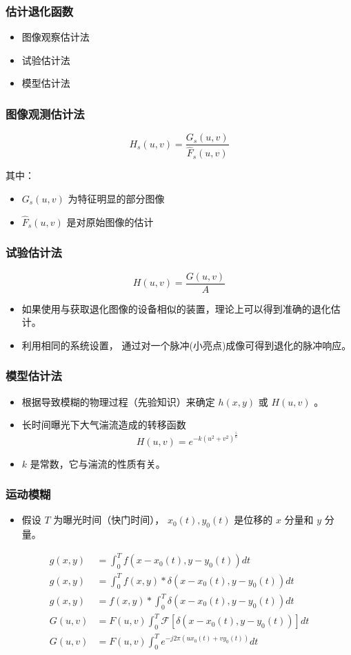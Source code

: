 \documentclass{beamer}
\begin{document}
\begin{frame}
\frametitle{估计退化函数}
\label{sec-9-5}

\begin{itemize}
\item 图像观察估计法
\item 试验估计法
\item 模型估计法
\end{itemize}
\end{frame}
\begin{frame}
\frametitle{图像观测估计法}
\label{sec-9-6}


\[ H_s(u,v) = \frac{G_s(u,v)}{\hat F_s(u,v)} \]

其中：
\begin{itemize}
\item $G_s(u,v)$ 为特征明显的部分图像
\item $\hat F_s(u,v)$ 是对原始图像的估计
\end{itemize}
\end{frame}
\begin{frame}
\frametitle{试验估计法}
\label{sec-9-7}


\[ H(u,v)=\frac{G(u,v)}{A} \]

\begin{itemize}
\item 如果使用与获取退化图像的设备相似的装置，理论上可以得到准确的退化估计。
\item 利用相同的系统设置， 通过对一个脉冲(小亮点)成像可得到退化的脉冲响应。
\end{itemize}
\end{frame}
\begin{frame}
\frametitle{模型估计法}
\label{sec-9-8}


\begin{itemize}
\item 根据导致模糊的物理过程（先验知识）来确定 $h(x,y)$ 或 $H(u,v)$ 。
\item 长时间曝光下大气湍流造成的转移函数
   \[ H(u,v) = e^{-k(u^2+v^2)^{\frac{5}{6}}} \]
\item $k$ 是常数，它与湍流的性质有关。
\end{itemize}
\end{frame}
\begin{frame}
\frametitle{运动模糊}
\label{sec-9-9}

\begin{itemize}
\item 假设 $T$ 为曝光时间（快门时间）， $x_0(t),y_0(t)$ 是位移的 $x$ 分量和 $y$ 分量。
\end{itemize}
\begin{align*}
g(x,y) &= \int_0^T f(x-x_0(t),y-y_0(t)) dt \\
g(x,y) &= \int_0^T f(x,y)*\delta(x-x_0(t),y-y_0(t)) dt \\
g(x,y) &= f(x,y)* \int_0^T \delta(x-x_0(t),y-y_0(t)) dt \\
G(u,v) &= F(u,v) \int_0^T \mathcal{F}[\delta(x-x_0(t),y-y_0(t))] dt \\
G(u,v) &= F(u,v) \int_0^T e^{-j2\pi(ux_0(t)+vy_0(t))} dt 
\end{align*}
\end{frame}
\end{document}
